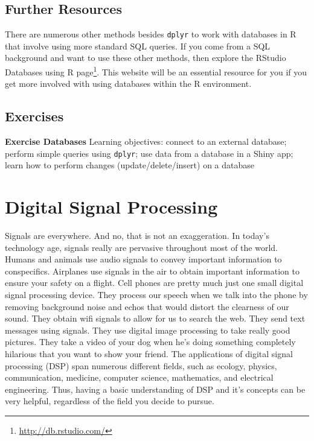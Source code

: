 \documentclass[
]{krantz}
\renewcommand{\href}[2]{#2\footnote{\url{#1}}}
\begin{document}
\hypertarget{further-resources}{%
\section{Further Resources}\label{further-resources}}

There are numerous other methods besides \texttt{dplyr} to work with databases in R that involve using more standard SQL queries. If you come from a SQL background and want to use these other methods, then explore the \href{http://db.rstudio.com/}{RStudio Databases using R page}. This website will be an essential resource for you if you get more involved with using databases within the R environment.

\hypertarget{exercises-10}{%
\section{Exercises}\label{exercises-10}}

\textbf{Exercise Databases} Learning objectives: connect to an external database; perform simple queries using \texttt{dplyr}; use data from a database in a Shiny app; learn how to perform changes (update/delete/insert) on a database

\hypertarget{digital-signal-processing}{%
\chapter{Digital Signal Processing}\label{digital-signal-processing}}

Signals are everywhere. And no, that is not an exaggeration. In today's technology age, signals really are pervasive throughout most of the world. Humans and animals use audio signals to convey important information to conspecifics. Airplanes use signals in the air to obtain important information to ensure your safety on a flight. Cell phones are pretty much just one small digital signal processing device. They process our speech when we talk into the phone by removing background noise and echos that would distort the clearness of our sound. They obtain wifi signals to allow for us to search the web. They send text messages using signals. They use digital image processing to take really good pictures. They take a video of your dog when he's doing something completely hilarious that you want to show your friend. The applications of digital signal processing (DSP) span numerous different fields, such as ecology, physics, communication, medicine, computer science, mathematics, and electrical engineering. Thus, having a basic understanding of DSP and it's concepts can be very helpful, regardless of the field you decide to pursue.
\end{document}
